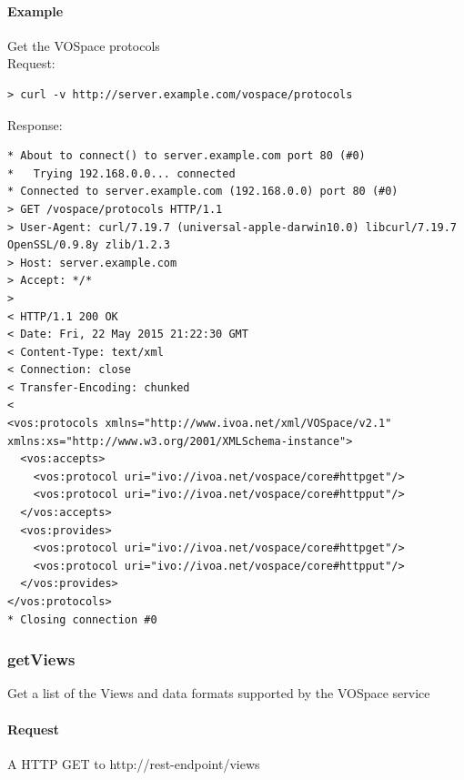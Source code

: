 \documentclass[11pt,a4paper]{ivoa}
\begin{document}
\paragraph{Example}
Get the VOSpace protocols
\\[5px]
\noindent
Request:
\begin{lstlisting}
> curl -v http://server.example.com/vospace/protocols
\end{lstlisting}
Response:
\begin{lstlisting}
* About to connect() to server.example.com port 80 (#0)
*   Trying 192.168.0.0... connected
* Connected to server.example.com (192.168.0.0) port 80 (#0)
> GET /vospace/protocols HTTP/1.1
> User-Agent: curl/7.19.7 (universal-apple-darwin10.0) libcurl/7.19.7 OpenSSL/0.9.8y zlib/1.2.3
> Host: server.example.com
> Accept: */*
>
< HTTP/1.1 200 OK
< Date: Fri, 22 May 2015 21:22:30 GMT
< Content-Type: text/xml
< Connection: close
< Transfer-Encoding: chunked
<
<vos:protocols xmlns="http://www.ivoa.net/xml/VOSpace/v2.1" xmlns:xs="http://www.w3.org/2001/XMLSchema-instance">
  <vos:accepts>
    <vos:protocol uri="ivo://ivoa.net/vospace/core#httpget"/>
    <vos:protocol uri="ivo://ivoa.net/vospace/core#httpput"/>
  </vos:accepts>
  <vos:provides>
    <vos:protocol uri="ivo://ivoa.net/vospace/core#httpget"/>
    <vos:protocol uri="ivo://ivoa.net/vospace/core#httpput"/>
  </vos:provides>
</vos:protocols>
* Closing connection #0
\end{lstlisting}

\subsubsection{getViews}
\label{subsubsec:getviews}
Get a list of the Views and data formats supported by the VOSpace service

\paragraph{Request}
A HTTP GET to http://rest-endpoint/views
\end{document}

